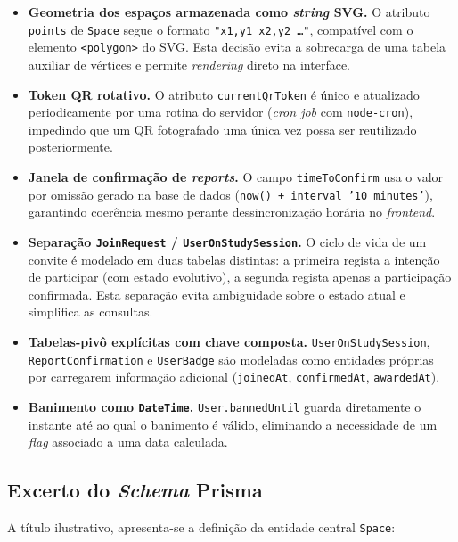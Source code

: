 \documentclass[11pt,a4paper]{article}
\begin{document}
\begin{itemize}[leftmargin=*]
    \item \textbf{Geometria dos espaços armazenada como \emph{string} SVG.}
          O atributo \texttt{points} de \texttt{Space} segue o formato
          \texttt{"x1,y1 x2,y2 \dots"}, compatível com o elemento \texttt{<polygon>}
          do SVG. Esta decisão evita a sobrecarga de uma tabela auxiliar de vértices
          e permite \emph{rendering} direto na interface.
    \item \textbf{Token QR rotativo.} O atributo \texttt{currentQrToken} é
          único e atualizado periodicamente por uma rotina do servidor (\emph{cron
              job} com \texttt{node-cron}), impedindo que um QR fotografado uma única
          vez possa ser reutilizado posteriormente.
    \item \textbf{Janela de confirmação de \emph{reports}.} O campo
          \texttt{timeToConfirm} usa o valor por omissão gerado na base de dados
          (\texttt{now() + interval '10 minutes'}), garantindo coerência mesmo
          perante dessincronização horária no \emph{frontend}.
    \item \textbf{Separação \texttt{JoinRequest} / \texttt{UserOnStudySession}.}
          O ciclo de vida de um convite é modelado em duas tabelas distintas: a
          primeira regista a intenção de participar (com estado evolutivo), a
          segunda regista apenas a participação confirmada. Esta separação evita
          ambiguidade sobre o estado atual e simplifica as consultas.
    \item \textbf{Tabelas-pivô explícitas com chave composta.}
          \texttt{UserOnStudySession}, \texttt{ReportConfirmation} e
          \texttt{UserBadge} são modeladas como entidades próprias por carregarem
          informação adicional (\texttt{joinedAt}, \texttt{confirmedAt},
          \texttt{awardedAt}).
    \item \textbf{Banimento como \texttt{DateTime}.}
          \texttt{User.bannedUntil} guarda diretamente o instante até ao qual o
          banimento é válido, eliminando a necessidade de um \emph{flag} associado a
          uma data calculada.
\end{itemize}

\subsection{Excerto do \emph{Schema} Prisma}

A título ilustrativo, apresenta-se a definição da entidade central
\texttt{Space}:
\end{document}
